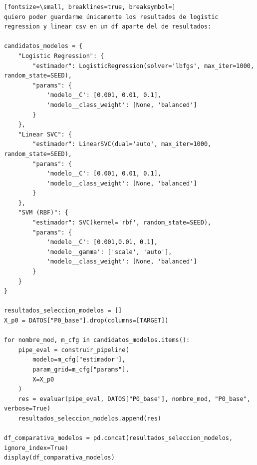 \documentclass[12pt,a4paper,oneside]{book}
\begin{document}
\begin{iaprompt}
\begin{Verbatim}[fontsize=\small, breaklines=true, breaksymbol=]
quiero poder guardarme únicamente los resultados de logistic regression y linear csv en un df aparte del de resultados:

candidatos_modelos = {
    "Logistic Regression": {
        "estimador": LogisticRegression(solver='lbfgs', max_iter=1000, random_state=SEED),
        "params": {
            'modelo__C': [0.001, 0.01, 0.1],
            'modelo__class_weight': [None, 'balanced']
        }
    },
    "Linear SVC": {
        "estimador": LinearSVC(dual='auto', max_iter=1000, random_state=SEED),
        "params": {
            'modelo__C': [0.001, 0.01, 0.1],
            'modelo__class_weight': [None, 'balanced']
        }
    },
    "SVM (RBF)": {
        "estimador": SVC(kernel='rbf', random_state=SEED),
        "params": {
            'modelo__C': [0.001,0.01, 0.1],
            'modelo__gamma': ['scale', 'auto'],
            'modelo__class_weight': [None, 'balanced']
        }
    }
}

resultados_seleccion_modelos = []
X_p0 = DATOS["P0_base"].drop(columns=[TARGET])

for nombre_mod, m_cfg in candidatos_modelos.items():
    pipe_eval = construir_pipeline(
        modelo=m_cfg["estimador"],
        param_grid=m_cfg["params"],
        X=X_p0
    )
    res = evaluar(pipe_eval, DATOS["P0_base"], nombre_mod, "P0_base", verbose=True)
    resultados_seleccion_modelos.append(res)

df_comparativa_modelos = pd.concat(resultados_seleccion_modelos, ignore_index=True)
display(df_comparativa_modelos)
\end{Verbatim}
\end{iaprompt}
\end{document}

